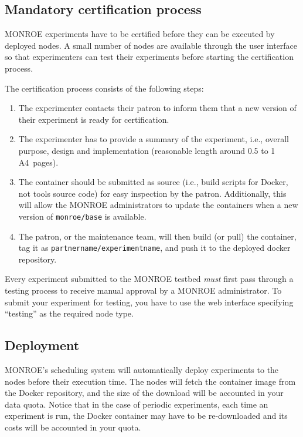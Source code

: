 \documentclass[a4paper,10pt]{article}
\newcommand{\monroe}{MONROE}
\newcommand{\identifier}[1]{{\texttt{\small{#1}}}}
\begin{document}
\subsection{Mandatory certification process}
\label{subsec:testingProcess}
\monroe{} experiments have to be certified before they can be executed by deployed nodes.
A small number of nodes are available through the user interface so that experimenters can test their experiments before starting the certification process.

The certification process consists of the following steps:
\begin{enumerate}
	\item The experimenter contacts their patron to inform them that a new version of their experiment is ready for certification.
	
	\item The experimenter has to provide a summary of the experiment, i.e., overall purpose, design and implementation (reasonable length around \num{0.5} to \num{1} A4~pages).
	
	\item The container should be submitted as source (i.e., build scripts for Docker, not tools source code) for easy inspection by the patron.
	Additionally, this will allow the \monroe{} administrators to update the containers when a new version of \identifier{monroe/base} is available.
	
	\item The patron, or the maintenance team, will then build (or pull) the container, tag it as \identifier{partnername/\allowbreak experimentname}, and push it to the deployed docker repository.
\end{enumerate}

Every experiment submitted to the \monroe{} testbed \emph{must} first pass through a testing process to receive manual approval by a \monroe{} administrator.
To submit your experiment for testing, you have to use the web interface specifying ``testing'' as the required node type.

\subsection{Deployment}
\label{subsec:deployment}
\monroe{}'s scheduling system will automatically deploy experiments to the nodes before their execution time.
The nodes will fetch the container image from the Docker repository, and the size of the download will be accounted in your data quota.
Notice that in the case of periodic experiments, each time an experiment is run, the Docker container may have to be re-downloaded and its costs will be accounted in your quota.
\end{document}
